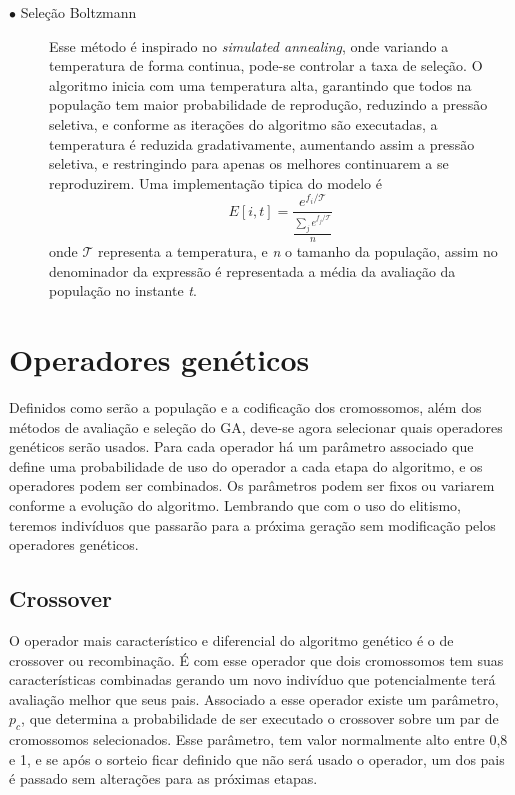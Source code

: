 \begin{description}
\item[$\bullet$ Seleção Boltzmann] \text{}

Esse método é inspirado no \textit{simulated annealing}, onde variando a temperatura de forma continua, pode-se controlar a taxa de seleção. O algoritmo inicia com uma temperatura alta, garantindo que todos na população tem maior probabilidade de reprodução, reduzindo a pressão seletiva, e conforme as iterações do algoritmo são executadas, a temperatura é reduzida gradativamente, aumentando assim a pressão seletiva, e restringindo para apenas os melhores continuarem a se reproduzirem. Uma implementação tipica do modelo é \[ E[i,t] = \frac{e^{f_i/\mathcal{T}}}{\frac{\sum_j e^{f_j/\mathcal{T}}}{n}}\] onde \(\mathcal{T}\) representa a temperatura, e \textit{n} o tamanho da população, assim no denominador da expressão é representada a média da avaliação da população no instante \textit{t}. \cite{Mitchell1996}

\end{description}

\section{Operadores genéticos}

Definidos como serão a população e a codificação dos cromossomos, além dos métodos de avaliação e seleção do GA, deve-se agora selecionar quais operadores genéticos serão usados. Para cada operador há um parâmetro associado que define uma probabilidade de uso do operador a cada etapa do algoritmo, e os operadores podem ser combinados. Os parâmetros podem ser fixos ou variarem conforme a evolução do algoritmo. Lembrando que com o uso do elitismo, teremos indivíduos que passarão para a próxima geração sem modificação pelos operadores genéticos.

\subsection{Crossover}
O operador mais característico e diferencial do algoritmo genético é o de crossover ou recombinação. É com esse operador que dois cromossomos tem suas características combinadas gerando um novo indivíduo que potencialmente terá avaliação melhor que seus pais. Associado a esse operador existe um parâmetro, \(p_c\), que determina a probabilidade de ser executado o crossover sobre um par de cromossomos selecionados. Esse parâmetro, tem valor normalmente alto entre 0,8 e 1, e se após o sorteio ficar definido que não será usado o operador, um dos pais é passado sem alterações para as próximas etapas.

